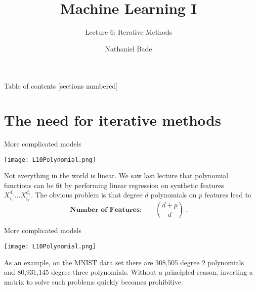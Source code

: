 \documentclass[10pt, table, dvipsnames,xcdraw, handout]{beamer}
\title{Machine Learning I}
\subtitle{Lecture 6: Iterative Methods}
\date{}
\author{Nathaniel Bade}
\institute{Northeastern University Department of Mathematics}
\begin{document}
\maketitle

\begin{frame}{Table of contents}
  [sections numbered]
  \tableofcontents[hideallsubsections]
\end{frame}



\section{The need for iterative methods}
\begin{frame}[fragile]{More complicated models}
  \begin{minipage}[t][0.5\textheight][t]{\textwidth}
	\centering \texttt{[image: L10Polynomial.png]} 
  \end{minipage}
  \vfill
\begin{minipage}[t][0.5\textheight][t]{\textwidth}
Not everything in the world is linear. We saw last lecture that polynomial functions can be fit by performing linear regression on synthetic features $X_{i_1}^{d_1}\ldots X_{i_r}^{d_r}$. \pause The obvious problem is that degree $d$ polynomials on $p$ features lead to 
$$
\textbf{Number of Features:}\hspace{2em}\binom{d+p}{d}\,.
$$
\end{minipage}
\end{frame}





\begin{frame}[fragile]{More complicated models}
  \begin{minipage}[t][0.5\textheight][t]{\textwidth}
	\centering \texttt{[image: L10Polynomial.png]} 
  \end{minipage}
  \vfill
\begin{minipage}[t][0.5\textheight][t]{\textwidth}
As an example, on the MNIST data set there are 308,505 degree 2 polynomials and 80,931,145 degree three polynomials. \pause Without a principled reason, inverting a matrix to solve such problems quickly becomes prohibitive. 
\end{minipage}
\end{frame}
\end{document}
